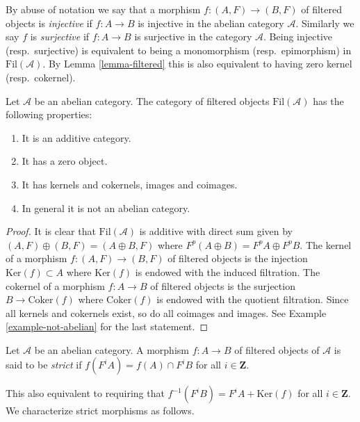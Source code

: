 \noindent
By abuse of notation we say that a morphism $f : (A, F) \to (B, F)$
of filtered objects is {\it injective} if $f : A \to B$ is injective
in the abelian category $\mathcal{A}$. Similarly we say $f$ is
{\it surjective} if $f : A \to B$ is surjective in the category
$\mathcal{A}$. Being injective (resp.\ surjective)
is equivalent to being a monomorphism (resp.\ epimorphism)
in $\text{Fil}(\mathcal{A})$. By
Lemma \ref{lemma-filtered}
this is also equivalent to having zero kernel (resp.\ cokernel).

\begin{lemma}
\label{lemma-filtered}
Let $\mathcal{A}$ be an abelian category.
The category of filtered objects $\text{Fil}(\mathcal{A})$
has the following properties:
\begin{enumerate}
\item It is an additive category.
\item It has a zero object.
\item It has kernels and cokernels, images and coimages.
\item In general it is not an abelian category.
\end{enumerate}
\end{lemma}

\begin{proof}
It is clear that $\text{Fil}(\mathcal{A})$ is additive with direct
sum given by $(A, F) \oplus (B, F) = (A \oplus B, F)$ where
$F^p(A \oplus B) = F^pA \oplus F^pB$.
The kernel of a morphism $f : (A, F) \to (B, F)$ of filtered
objects is the injection $\text{Ker}(f) \subset A$ where $\text{Ker}(f)$
is endowed with the induced filtration.
The cokernel of a morphism $f : A \to B$ of filtered
objects is the surjection $B \to \text{Coker}(f)$ where $\text{Coker}(f)$
is endowed with the quotient filtration. Since all kernels and cokernels
exist, so do all coimages and images. See
Example \ref{example-not-abelian}
for the last statement.
\end{proof}

\begin{definition}
\label{definition-strict}
Let $\mathcal{A}$ be an abelian category.
A morphism $f : A \to B$ of filtered objects of $\mathcal{A}$ is
said to be {\it strict} if $f(F^iA) = f(A) \cap F^iB$ for
all $i \in \mathbf{Z}$.
\end{definition}

\noindent
This also equivalent to requiring that $f^{-1}(F^iB) = F^iA + \text{Ker}(f)$
for all $i \in \mathbf{Z}$. We characterize strict morphisms
as follows.


